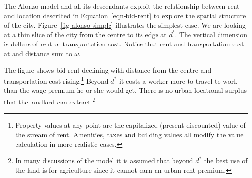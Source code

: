 







The \Gls{Alonzo model} and all its descendants exploit the relationship between rent and location  described in  Equation~\ref{eqn-bid-rent} to explore the spatial structure of the city. Figure~\ref{fig-alonso-simple} illustrates the simplest case. We are looking at a thin slice of the city from the centre to its edge at $d^*$. The vertical dimension is dollars of rent or transportation cost.  Notice that rent and transportation cost at and distance sum to $\omega$.

The figure shows  bid-rent declining with distance from the centre and transportation cost rising.\footnote{Property values  at any point are the capitalized (present discounted) value of the stream of rent. Amenities, taxes and building values all modify the value calculation in more realistic cases.}  Beyond $d^*$ it costs a worker more to travel to work than the wage premium  he or she would get.  There is no urban locational surplus that the landlord can extract.\footnote{In many discussions of the model it is assumed that beyond $d^*$ the best use of the land is for agriculture since it cannot earn an urban rent premium. }


